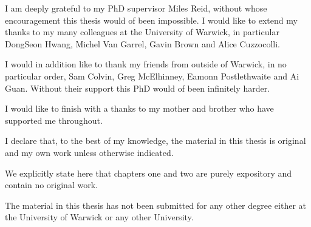 \documentclass[12pt,a4paper]{book}      %
\theoremstyle{definition}
\begin{document}
\thesistitlecolourpage           %


\tableofcontents                     %

\begin{thesisacknowledgments}        %

I am deeply grateful to my PhD supervisor Miles Reid, without whose encouragement this thesis would of been impossible. I would like to extend my thanks to my many colleagues at the University of Warwick, in particular DongSeon Hwang, Michel Van Garrel, Gavin Brown and Alice Cuzzocolli. 

I would in addition like to thank my friends from outside of Warwick, in no particular order, Sam Colvin, Greg McElhinney, Eamonn Postlethwaite and Ai Guan. Without their support this PhD would of been infinitely harder. 

I would like to finish with a thanks to my mother and brother who have supported me throughout.
\end{thesisacknowledgments}

\begin{thesisdeclaration}        %
I declare that, to the best of my knowledge, the material in this thesis is original and my own work unless otherwise indicated. 

We explicitly state here that chapters one and two are purely expository and contain no original work.

The material in this thesis has not been submitted for any other degree either at the University of Warwick or any other University.
\end{thesisdeclaration}
\end{document}
